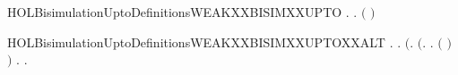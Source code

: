 \begin{SaveVerbatim}{HOLBisimulationUptoDefinitionsWEAKXXBISIMXXUPTO}
           \HOLSymConst{\HOLTokenForall{}}.
                \HOLTokenTransBegin\HOLConst{\ensuremath{\tau}}\HOLTokenTransEnd {} \HOLSymConst{\HOLTokenImp{}}
               \HOLSymConst{\HOLTokenExists{}}.
                      \HOLSymConst{\HOLTokenConj{}}
                   \ensuremath{(}    \ensuremath{)}  
\end{SaveVerbatim}
\newcommand{\HOLBisimulationUptoDefinitionsWEAKXXBISIMXXUPTO}{\UseVerbatim{HOLBisimulationUptoDefinitionsWEAKXXBISIMXXUPTO}}
\begin{SaveVerbatim}{HOLBisimulationUptoDefinitionsWEAKXXBISIMXXUPTOXXALT}
\HOLTokenTurnstile{} \HOLSymConst{\HOLTokenForall{}}.
         \HOLSymConst{\HOLTokenEquiv{}}
       \HOLSymConst{\HOLTokenForall{}} .
              \HOLSymConst{\HOLTokenImp{}}
           \ensuremath{(}\HOLSymConst{\HOLTokenForall{}}.
                \ensuremath{(}\HOLSymConst{\HOLTokenForall{}}.
                      \HOLTokenWeakTransBegin{} \HOLTokenWeakTransEnd {} \HOLSymConst{\HOLTokenImp{}}
                     \HOLSymConst{\HOLTokenExists{}}.
                          \HOLTokenWeakTransBegin{} \HOLTokenWeakTransEnd {} \HOLSymConst{\HOLTokenConj{}}
                         \ensuremath{(}    \ensuremath{)}  \ensuremath{)} \HOLSymConst{\HOLTokenConj{}}
                \HOLSymConst{\HOLTokenForall{}}.
                     \HOLTokenWeakTransBegin{} \HOLTokenWeakTransEnd {} \HOLSymConst{\HOLTokenImp{}}
                    \HOLSymConst{\HOLTokenExists{}}.
                         \HOLTokenWeakTransBegin{} \HOLTokenWeakTransEnd {} \HOLSymConst{\HOLTokenConj{}}

\end{SaveVerbatim}
